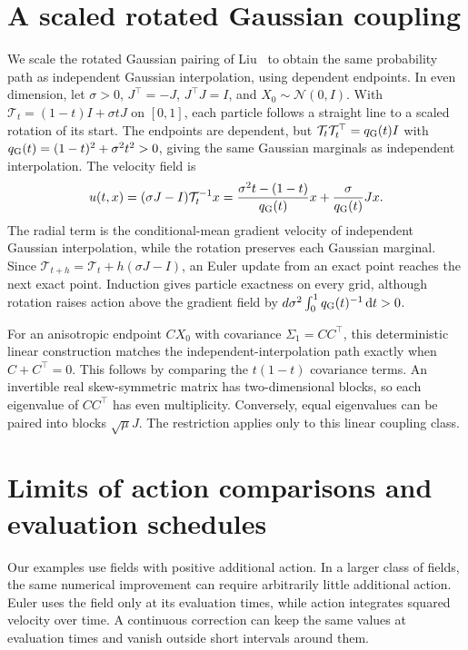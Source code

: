 \section{A scaled rotated Gaussian coupling}
\label{app:fm}

We scale the rotated Gaussian pairing of Liu~\citep[Example~3.5]{liu2022marginal} to obtain the same probability path as independent Gaussian interpolation, using dependent endpoints. In even dimension, let $\sigma>0$, $J^\top=-J$, $J^\top J=I$, and $X_0\sim\mathcal N(0,I)$. With $\mathcal T_t=(1-t)I+\sigma tJ$ on $[0,1]$, each particle follows a straight line to a scaled rotation of its start. The endpoints are dependent, but $\mathcal T_t\mathcal T_t^\top=q_{\rm G}(t)I$ with $q_{\rm G}(t)=(1-t)^2+\sigma^2t^2>0$, giving the same Gaussian marginals as independent interpolation. The velocity field is
\begin{equation}
 u(t,x)=(\sigma J-I)\mathcal T_t^{-1}x
 =\frac{\sigma^2t-(1-t)}{q_{\rm G}(t)}x+\frac\sigma{q_{\rm G}(t)}Jx.
 \label{eq:fm-rotated-field}
\end{equation}
The radial term is the conditional-mean gradient velocity of independent Gaussian interpolation, while the rotation preserves each Gaussian marginal. Since $\mathcal T_{t+h}=\mathcal T_t+h(\sigma J-I)$, an Euler update from an exact point reaches the next exact point. Induction gives particle exactness on every grid, although rotation raises action above the gradient field by $d\sigma^2\int_0^1q_{\rm G}(t)^{-1}\,\mathrm d t>0$.

For an anisotropic endpoint $CX_0$ with covariance $\Sigma_1=CC^\top$, this deterministic linear construction matches the independent-interpolation path exactly when $C+C^\top=0$. This follows by comparing the $t(1-t)$ covariance terms. An invertible real skew-symmetric matrix has two-dimensional blocks, so each eigenvalue of $CC^\top$ has even multiplicity. Conversely, equal eigenvalues can be paired into blocks $\sqrt\mu J$. The restriction applies only to this linear coupling class.

\section{Limits of action comparisons and evaluation schedules}
\label{app:schedules}

Our examples use fields with positive additional action. In a larger class of fields, the same numerical improvement can require arbitrarily little additional action. Euler uses the field only at its evaluation times, while action integrates squared velocity over time. A continuous correction can keep the same values at evaluation times and vanish outside short intervals around them.

